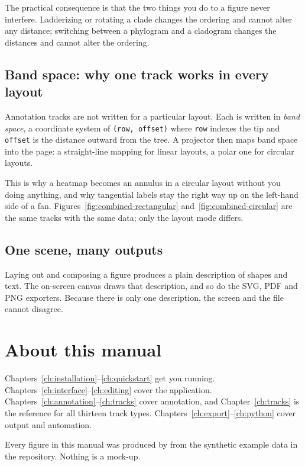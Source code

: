 The practical consequence is that the two things you do to a figure never
interfere. Ladderizing or rotating a clade changes the ordering and cannot alter
any distance; switching between a phylogram and a cladogram changes the distances
and cannot alter the ordering.

\subsection{Band space: why one track works in every layout}

Annotation tracks are not written for a particular layout. Each is written in
\emph{band space}, a coordinate system of \texttt{(row, offset)} where
\texttt{row} indexes the tip and \texttt{offset} is the distance outward from the
tree. A projector then maps band space into the page: a straight-line mapping for
linear layouts, a polar one for circular layouts.

This is why a heatmap becomes an annulus in a circular layout without you doing
anything, and why tangential labels stay the right way up on the left-hand side
of a fan. Figures~\ref{fig:combined-rectangular} and~\ref{fig:combined-circular}
are the same tracks with the same data; only the layout mode differs.

\subsection{One scene, many outputs}

Laying out and composing a figure produces a plain description of shapes and
text. The on-screen canvas draws that description, and so do the SVG, PDF and PNG
exporters. Because there is only one description, the screen and the file cannot
disagree.

\section{About this manual}

Chapters~\ref{ch:installation}--\ref{ch:quickstart} get you running.
Chapters~\ref{ch:interface}--\ref{ch:editing} cover the application.
Chapters~\ref{ch:annotation}--\ref{ch:tracks} cover annotation, and
Chapter~\ref{ch:tracks} is the reference for all thirteen track types.
Chapters~\ref{ch:export}--\ref{ch:python} cover output and automation.

Every figure in this manual was produced by \app{} from the synthetic example
data in the repository. Nothing is a mock-up.
